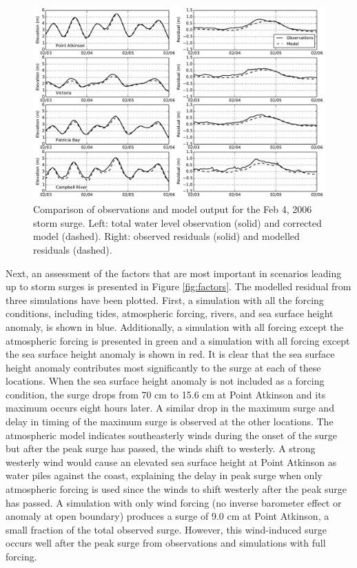 \documentclass[pdftex,10pt]{article}
\begin{document}
\begin{figure}
\centering
\includegraphics[scale=0.6]{Figures/feb2006_bg.pdf}
\caption{Comparison of observations and model output for the Feb 4, 2006 storm surge. Left: total water level observation (solid) and corrected model (dashed). Right: observed residuals (solid) and modelled residuals (dashed).}
\label{fig:feb2006}
\end{figure}

Next, an assessment of the factors that are most important in scenarios leading up to storm surges is presented in Figure \ref{fig:factors}. The modelled residual from three simulations have been plotted. First, a simulation with all the forcing conditions, including tides, atmospheric forcing, rivers, and sea surface height anomaly, is shown in blue. Additionally, a simulation with all forcing except the atmospheric forcing is presented in green and a simulation with all forcing except the sea surface height anomaly is shown in red. It is clear that the sea surface height anomaly contributes most significantly to the surge at each of these locations. When the sea surface height anomaly is not included as a forcing condition, the surge drops from 70 cm to 15.6 cm at Point Atkinson and its maximum occurs eight hours later.  A similar drop in the maximum surge and delay in timing of the maximum surge is observed at the other locations. The atmospheric model indicates southeasterly winds during the onset of the surge but after the peak surge has passed, the winds shift to westerly. A strong westerly wind would cause an elevated sea surface height at Point Atkinson as water piles against the coast, explaining the delay in peak surge when only atmospheric forcing is used since the winds to shift westerly after the peak surge has passed. A simulation with only wind forcing (no inverse barometer effect or anomaly at open boundary) produces a surge of 9.0 cm at Point Atkinson, a small fraction of the total observed surge. However, this wind-induced surge occurs well after the peak surge from observations and simulations with full forcing.
\end{document}
